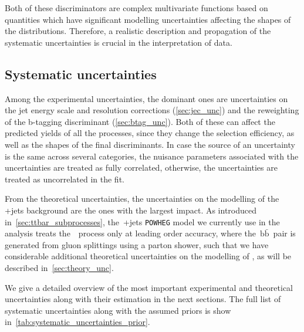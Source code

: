 Both of these discriminators are complex multivariate functions based on quantities which have significant modelling uncertainties affecting the shapes of the distributions. Therefore, a realistic description and propagation of the systematic uncertainties is crucial in the interpretation of data.

\subsection{Systematic uncertainties}
\label{sec:systematic_unc}
Among the experimental uncertainties, the dominant ones are uncertainties on the jet energy scale and resolution corrections (\cref{sec:jec_unc}) and the reweighting of the b-tagging discriminant (\cref{sec:btag_unc}). Both of these can affect the predicted yields of all the processes, since they change the selection efficiency, as well as the shapes of the final discriminants. In case the source of an uncertainty is the same across several categories, the nuisance parameters associated with the uncertainties are treated as fully correlated, otherwise, the uncertainties are treated as uncorrelated in the fit.

From the theoretical uncertainties, the uncertainties on the modelling of the \ttbar+jets background are the ones with the largest impact. As introduced in~\cref{sec:ttbar_subprocesses}, the~\ttbar+jets \texttt{POWHEG} model we currently use in the analysis treats the~\ttbb~process only at leading order accuracy, where the~$\mathrm{b}\bar{\mathrm{b}}$~pair is generated from gluon splittings using a parton shower, such that we have considerable additional theoretical uncertainties on the modelling of \ttbb, as will be described in~\cref{sec:theory_unc}.

We give a detailed overview of the most important experimental and theoretical uncertainties along with their estimation in the next sections. The full list of systematic uncertainties along with the assumed priors is show in~\cref{tab:systematic_uncertainties_prior}.

